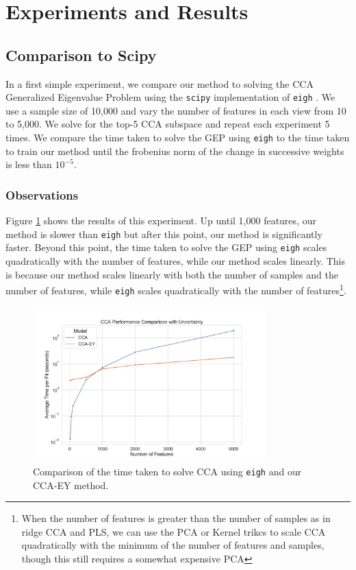 \section{Experiments and Results}

\subsection{Comparison to Scipy}
In a first simple experiment, we compare our method to solving the CCA Generalized Eigenvalue Problem using the \texttt{scipy} implementation of \texttt{eigh} \citep{virtanen2020scipy}.
We use a sample size of 10,000 and vary the number of features in each view from 10 to 5,000.
We solve for the top-5 CCA subspace and repeat each experiment 5 times.
We compare the time taken to solve the GEP using \texttt{eigh} to the time taken to train our method until the frobenius norm of the change in successive weights is less than $10^{-5}$.

\subsubsection{Observations}
Figure \ref{fig:cca-comparison} shows the results of this experiment.
Up until 1,000 features, our method is slower than \texttt{eigh} but after this point, our method is significantly faster.
Beyond this point, the time taken to solve the GEP using \texttt{eigh} scales quadratically with the number of features, while our method scales linearly.
This is because our method scales linearly with both the number of samples and the number of features, while \texttt{eigh} scales quadratically with the number of features\footnote{When the number of features is greater than the number of samples as in ridge CCA and PLS, we can use the PCA or Kernel trikcs to scale CCA quadratically with the minimum of the number of features and samples, though this still requires a somewhat expensive PCA}.

\begin{figure}
    \centering
    \includegraphics[width=0.8\textwidth]{figures/benchmarks/cca_comparison_log}
    \caption{Comparison of the time taken to solve CCA using \texttt{eigh} and our CCA-EY method.}
    \label{fig:cca-comparison}
\end{figure}

